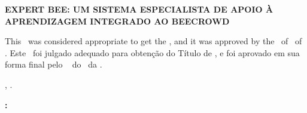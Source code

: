 


\begin{folhadeaprovacao}

    \begin{center}
        {\imprimirautor}

        \begin{center}
            \ABNTEXchapterfont\bfseries\MakeUppercase{Expert Bee: Um Sistema Especialista de Apoio à Aprendizagem Integrado ao Beecrowd}\ifnotempty{\imprimirsubtitulo}{: \imprimirsubtitulo}
        \end{center}

        \begin{minipage}{\textwidth}
            \lang
            {
                This \imprimirtipotrabalho~was considered appropriate to get the \imprimirformacao,
                and it was approved by the \imprimirprograma~of \imprimircentro~of \imprimirinstituicao.
            }
            {
                Este \imprimirtipotrabalho~foi julgado adequado para obtenção do Título de \imprimirformacao,
                e foi aprovado em sua forma final pelo \imprimirprograma~
                do \imprimircentro~da \imprimirinstituicao.
            }
         \end{minipage}%
    \end{center}

    \begin{center}
        \imprimirlocal, \imprimirdata.
    \end{center}


    \vspace*{1cm}

    \begin{flushleft}
        \textbf{:}
    \end{flushleft}

    \vspace*{0.5cm}

    \begin{center}
        \assinatura{%
            \textbf{\imprimirorientador} \\ \imprimirorientadorRotulo\\
            \imprimirinstituicao~--~\imprimirinstituicaosigla
        }
        \vspace*{0.5cm}


\end{center}
\end{folhadeaprovacao}
